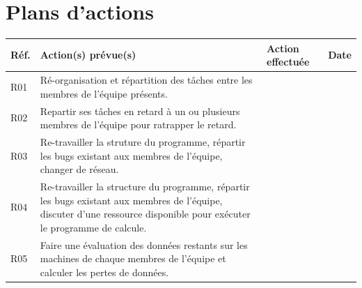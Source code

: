 \documentclass[a4paper,11pt,french]{article}
\begin{document}
\section{Plans d'actions}
\begin{center}
\begin{tabular}{|l|p{8cm}|l|l|}
\hline
\textbf{Réf.}&\textbf{Action(s) prévue(s)}&\textbf{Action effectuée}&\textbf{Date}\\
\hline
	R01 & 
	Ré-organisation et répartition des tâches entre les membres de l'équipe présents. & & \\
\hline
	R02 &
	Repartir ses tâches en retard à un ou plusieurs membres de l'équipe pour ratrapper le retard. & & \\
\hline
	R03 &
	Re-travailler la struture du programme, répartir les bugs existant aux membres de l'équipe, changer de réseau. & & \\
\hline
R04 &
	Re-travailler la structure du programme, répartir les bugs existant aux membres de l'équipe, discuter d'une ressource disponible pour exécuter le programme de calcule.& & \\
\hline
R05 &
	Faire une évaluation des données restants sur les machines de chaque membres de l'équipe et calculer les pertes de données. & & \\
\hline
\end{tabular}
\end{center}
\end{document}
